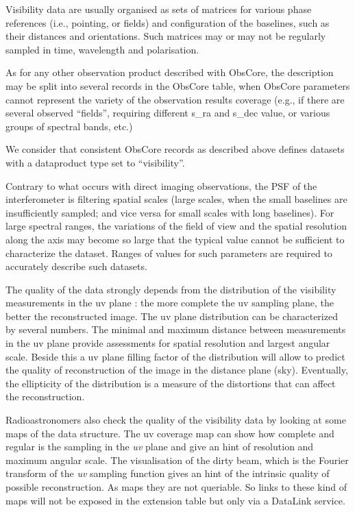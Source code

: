 \documentclass[11pt,a4paper]{ivoa}
\begin{document}
Visibility data are usually organised as sets of matrices for various phase references
(i.e., pointing, or fields) and configuration of the baselines, such as their
distances and orientations. Such matrices may or may not be regularly sampled in time,
wavelength and polarisation.

As for any other observation product described with ObsCore, the description may be split into
several records in the ObsCore table, when ObsCore parameters cannot represent the
variety of the observation results coverage (e.g., if there are several observed ``fields'',
requiring different s\_ra and s\_dec value, or various groups of spectral bands, etc.)

We consider that consistent ObsCore records as described above defines datasets with
a dataproduct type set to ``visibility''.


Contrary to what occurs with direct imaging observations, the PSF of the interferometer
is filtering spatial scales (large scales, when the small baselines are insufficiently
sampled; and vice versa for small scales with long baselines).
For large spectral ranges, the variations of the field of view and the spatial resolution
along the axis may become so large that the typical value cannot be sufficient to
characterize the dataset. Ranges of values for such parameters are required to accurately
describe such datasets.

The quality of the data strongly depends from the distribution of the visibility measurements
in the uv plane : the more complete the uv sampling plane, the better the reconstructed image.
The uv plane distribution can be characterized by several numbers.
The minimal and maximum distance between measurements in the uv plane provide assessments for
spatial resolution and largest angular scale.
Beside this a uv plane filling factor of the distribution will allow to predict the quality
of reconstruction of the image in the distance plane (sky).
Eventually, the ellipticity of the distribution is a measure of the distortions that can
affect the reconstruction.

Radioastronomers also check the quality of the visibility data by looking at some maps of
the data structure. The uv coverage map can show how complete and regular is the sampling in
the \emph{uv} plane and give an hint of resolution and maximum angular scale.
The visualisation of the dirty beam, which is the Fourier transform of the \emph{uv} sampling
function gives an hint of the intrinsic quality of possible reconstruction. As maps they are
not queriable. So links to these kind of maps will not be exposed in the extension
table but only via a DataLink service.
\end{document}
